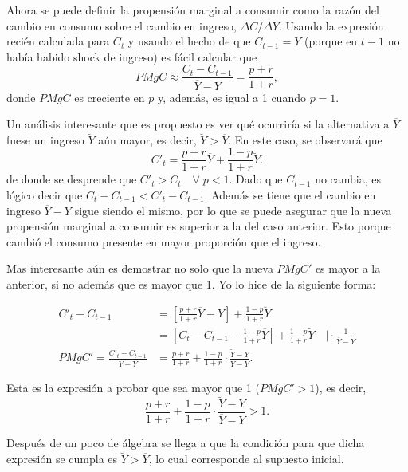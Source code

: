 \documentclass[DeGregorioResumen]{subfiles}
\begin{document}
Ahora se puede definir la propensión marginal a consumir como la razón del cambio en consumo sobre el cambio en ingreso, $	\Delta C/\Delta Y$. Usando la expresión recién calculada para $C_t$ y usando el hecho de que $C_{t-1}=Y$ (porque en $t-1$ no había habido shock de ingreso) es fácil calcular que
\begin{equation}
PMgC \approx \frac{C_t-C_{t-1}}{\overline{Y}-Y} = \frac{p+r}{1+r},
\end{equation}
donde $PMgC$ es creciente en $p$ y, además, es igual a 1 cuando $p=1$.

Un análisis interesante que es propuesto es ver qué ocurriría si la alternativa a $\overline{Y}$ fuese un ingreso $\breve{Y}$ aún mayor, es decir, $\breve{Y}>\overline{Y}$. En este caso, se observará que
\begin{equation*}
C'_t=\frac{p+r}{1+r}\overline{Y}+\frac{1-p}{1+r}\breve{Y}.
\end{equation*}
de donde se desprende que $C'_{t}>C_{t} \quad \forall \; p<1$. Dado que  $C_{t-1}$ no cambia, es lógico decir que $C_t-C_{t-1}<C'_t-C_{t-1}$. Además se tiene que el cambio en ingreso $\overline{Y}-Y$ sigue siendo el mismo, por lo que se puede asegurar que la nueva propensión marginal a consumir es superior a la del caso anterior. Esto porque cambió el consumo presente en mayor proporción que el ingreso.

Mas interesante aún es demostrar no solo que la nueva $PMgC'$ es mayor a la anterior, si no además que es mayor que 1. Yo lo hice de la siguiente forma:

\begin{align*}
C'_t-C_{t-1} &= \left[\frac{p+r}{1+r}\overline{Y}-Y\right]+\frac{1-p}{1+r}\breve{Y} \\
 &= \left[C_t-C_{t-1}-\frac{1-p}{1+r}\overline{Y}\right]+\frac{1-p}{1+r}\breve{Y} \quad \bigg|\cdot \frac{1}{\overline{Y}-Y} \\
PMgC'=\frac{C'_t-C_{t-1}}{\overline{Y}-Y}&= \frac{p+r}{1+r} + \frac{1-p}{1+r}\cdot\frac{\breve{Y}-Y}{\overline{Y}-Y}.
\end{align*}

Esta es la expresión a probar que sea mayor que 1 ($PMgC'>1$), es decir,
\begin{equation*}
\frac{p+r}{1+r} + \frac{1-p}{1+r}\cdot\frac{\breve{Y}-Y}{\overline{Y}-Y} > 1.
\end{equation*}

Después de un poco de álgebra se llega a que la condición para que dicha expresión se cumpla es $\breve{Y}>\overline{Y}$, lo cual corresponde al supuesto inicial.
\end{document}
